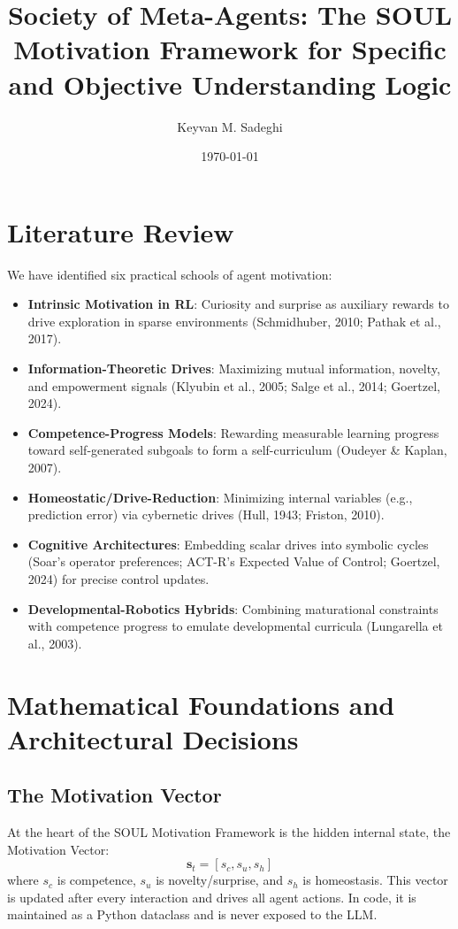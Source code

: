 \documentclass[11pt]{article}
\title{Society of Meta-Agents: The SOUL Motivation Framework for Specific and Objective Understanding Logic}
\author{Keyvan M. Sadeghi}
\date{\today}
\begin{document}
\maketitle

\section{Literature Review}

We have identified six practical schools of agent motivation:

\begin{itemize}
  \item \textbf{Intrinsic Motivation in RL}: Curiosity and surprise as auxiliary rewards to drive exploration in sparse environments (Schmidhuber, 2010; Pathak et al., 2017).
  \item \textbf{Information-Theoretic Drives}: Maximizing mutual information, novelty, and empowerment signals (Klyubin et al., 2005; Salge et al., 2014; Goertzel, 2024).
  \item \textbf{Competence-Progress Models}: Rewarding measurable learning progress toward self-generated subgoals to form a self-curriculum (Oudeyer \& Kaplan, 2007).
  \item \textbf{Homeostatic/Drive-Reduction}: Minimizing internal variables (e.g., prediction error) via cybernetic drives (Hull, 1943; Friston, 2010).
  \item \textbf{Cognitive Architectures}: Embedding scalar drives into symbolic cycles (Soar's operator preferences; ACT-R's Expected Value of Control; Goertzel, 2024) for precise control updates.
  \item \textbf{Developmental-Robotics Hybrids}: Combining maturational constraints with competence progress to emulate developmental curricula (Lungarella et al., 2003).
\end{itemize}

\section{Mathematical Foundations and Architectural Decisions}

\subsection{The Motivation Vector}
At the heart of the SOUL Motivation Framework is the hidden internal state, the Motivation Vector:
\[
  \mathbf{s}_t = [s_c, s_u, s_h]
\]
where $s_c$ is competence, $s_u$ is novelty/surprise, and $s_h$ is homeostasis. This vector is updated after every interaction and drives all agent actions. In code, it is maintained as a Python dataclass and is never exposed to the LLM.
\end{document}
